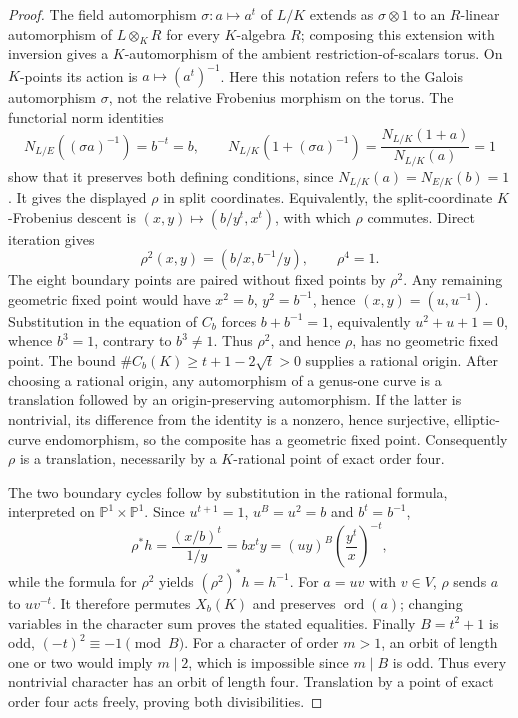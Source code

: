 \documentclass[11pt]{article}
\begin{document}
\begin{proof}
The field automorphism $\sigma:a\mapsto a^t$ of $L/K$
extends as $\sigma\otimes1$ to an $R$-linear automorphism of
$L\otimes_K R$ for every $K$-algebra $R$;
composing this extension with inversion gives a $K$-automorphism
of the ambient restriction-of-scalars torus. On $K$-points its
action is $a\mapsto(a^t)^{-1}$. Here this notation refers to the
Galois automorphism $\sigma$, not the relative Frobenius morphism
on the torus. The functorial norm identities
\[
 N_{L/E}((\sigma a)^{-1})=b^{-t}=b,\qquad
 N_{L/K}(1+(\sigma a)^{-1})
   =\frac{N_{L/K}(1+a)}{N_{L/K}(a)}=1
\]
show that it preserves both defining conditions, since
$N_{L/K}(a)=N_{E/K}(b)=1$. It gives the displayed $\rho$
in split coordinates. Equivalently, the split-coordinate
$K$-Frobenius descent is $(x,y)\mapsto(b/y^t,x^t)$, with which
$\rho$ commutes. Direct
iteration gives
\[
 \rho^2(x,y)=(b/x,b^{-1}/y),\qquad \rho^4=1.
\]
The eight boundary points are paired without fixed points by
$\rho^2$. Any remaining geometric fixed point would have
$x^2=b$, $y^2=b^{-1}$, hence $(x,y)=(u,u^{-1})$.
Substitution in the equation of $C_b$ forces
$b+b^{-1}=1$, equivalently $u^2+u+1=0$, whence $b^3=1$,
contrary to $b^3\ne1$. Thus $\rho^2$,
and hence $\rho$, has no geometric fixed point. The bound
$\#C_b(K)\ge t+1-2\sqrt t>0$ supplies a rational origin.
After choosing a rational origin, any automorphism of a genus-one
curve is a translation followed by an origin-preserving
automorphism. If the latter is nontrivial, its difference from the
identity is a nonzero, hence surjective, elliptic-curve
endomorphism, so the composite has a geometric fixed point.
Consequently $\rho$ is a translation, necessarily by a
$K$-rational point of exact order four.

The two boundary cycles follow by substitution in the rational
formula, interpreted on $\mathbb P^1\times\mathbb P^1$. Since
$u^{t+1}=1$, $u^B=u^2=b$ and $b^t=b^{-1}$,
\[
 \rho^*h=\frac{(x/b)^t}{1/y}
   =b x^t y=(uy)^B\left(\frac{y^t}{x}\right)^{-t},
\]
while the formula for $\rho^2$ yields $(\rho^2)^*h=h^{-1}$.
For $a=uv$ with $v\in V$, $\rho$ sends $a$ to
$uv^{-t}$. It therefore permutes $X_b(K)$ and preserves
$\operatorname{ord}(a)$; changing variables in the character sum
proves the stated equalities. Finally $B=t^2+1$ is odd,
$(-t)^2\equiv-1\pmod B$. For a character of order $m>1$,
an orbit of length one or two would imply $m\mid2$,
which is impossible since $m\mid B$ is odd. Thus every
nontrivial character has an orbit of length four. Translation
by a point of exact order four acts freely, proving both
divisibilities.
\end{proof}
\end{document}

